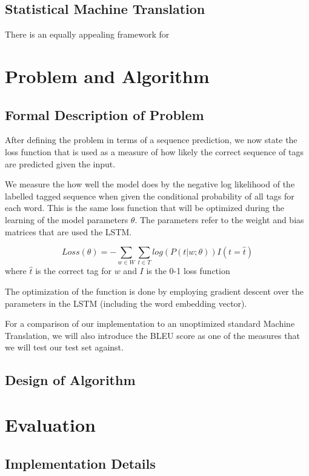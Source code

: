 \documentclass[fyp]{socreport}
\begin{document}
\section{Statistical Machine Translation}
There is an equally appealing framework for

\label{ch:related}


\chapter{Problem and Algorithm}
\section{Formal Description of Problem}
After defining the problem in terms of a sequence prediction, we now state the
loss function that is used as a measure of how likely the correct sequence of
tags are predicted given the input.

We measure the how well the model does by the negative log likelihood
of the labelled tagged sequence when given the conditional probability of all
tags for each word. This is the same loss function that will be optimized during
the learning of the model parameters $\theta$. The parameters refer to the
weight and bias matrices that are used the LSTM.

\begin{equation}
  Loss(\theta) = -\sum_{w \in W} \sum_{t \in T} log(P(t | w; \theta)) I(t = \hat{t})
\end{equation}
where $\hat{t}$ is the correct tag for $w$ and $I$ is the 0-1 loss function

The optimization of the function is done by employing gradient descent over the
parameters in the LSTM (including the word embedding vector).

For a comparison of our implementation to an unoptimized standard Machine Translation,
we will also introduce the BLEU score as one of the measures that we will test our
test set against.


\section{Design of Algorithm}



\chapter{Evaluation}

\section{Implementation Details}
\end{document}
